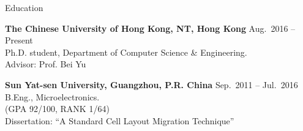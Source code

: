 

\begin{rSection}{Education}



{\bf The Chinese University of Hong Kong, NT, Hong Kong} \hfill { Aug.~2016 -- Present}\\
Ph.D. student, Department of Computer Science \& Engineering. \\
Advisor: Prof. Bei Yu

{\bf Sun Yat-sen University, Guangzhou, P.R. China} \hfill { Sep.~2011 -- Jul.~2016}\\
B.Eng., Microelectronics.\\
(GPA 92/100, RANK 1/64) \\
Dissertation: ``A Standard Cell Layout Migration Technique'' 
\end{rSection}

